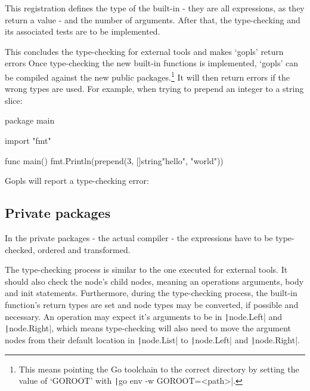 \begin{code}
\end{code}
This registration defines the type of the built-in - they are all expressions,
as they return a value - and the number of arguments.
After that, the type-checking and its associated tests are to be implemented.

This concludes the type-checking for external tools and makes `gopls' return errors
Once type-checking the new built-in functions is implemented, `gopls' can be
compiled against the new public packages.\footnote{
This means pointing the Go toolchain to the correct directory by setting
the value of `GOROOT' with \texttt|go env -w GOROOT=<path>|.
}
It will then return errors if the wrong types are used. For example, when trying
to prepend an integer to a string slice:

\begin{gocode}
package main

import "fmt"

func main() {
    fmt.Println(prepend(3, []string{"hello", "world"}))
}
\end{gocode}

Gopls will report a type-checking error:

\subsection{Private packages}

In the private packages - the actual compiler - the expressions have to be
type-checked, ordered and transformed.

The type-checking process is similar to the one executed for external tools.
It should also check the node's child nodes, meaning an operations
arguments, body and init statements. Furthermore, during the type-checking
process, the built-in function's return types are set and node types
may be converted, if possible and necessary.
An operation may expect it's arguments to be in \texttt|node.Left|
and \texttt|node.Right|, which means type-checking will also need
to move the argument nodes from their default location in
\texttt|node.List| to \texttt|node.Left| and
\texttt|node.Right|.

